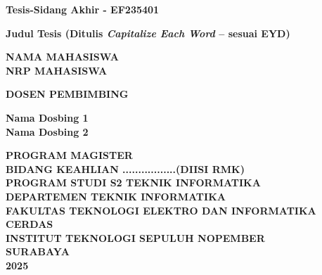 \documentclass[a4paper]{article}
\begin{document}
\begin{flushleft}
\hspace*{2.2cm}
\parbox{15cm}{
    {\fontsize{12pt}{14pt}\selectfont\bfseries Tesis-Sidang Akhir - EF235401}
    
    \vspace{0.5cm}
    
    {\fontsize{18pt}{22pt}\selectfont\bfseries 
    Judul Tesis (Ditulis \textit{Capitalize Each Word} – sesuai EYD)}
    
    \vspace{2.5cm}
    
    {\fontsize{12pt}{14pt}\selectfont\bfseries 
    NAMA MAHASISWA\\
    NRP MAHASISWA}
    
    \vspace{1.3cm}
    
    {\fontsize{12pt}{14pt}\selectfont\bfseries DOSEN PEMBIMBING}
    
    \vspace{0.2cm}
    
    {\fontsize{12pt}{14pt}\selectfont\bfseries 
    Nama Dosbing 1\\
    Nama Dosbing 2}
    
    \vspace{1.3cm}
    
    {\fontsize{12pt}{14pt}\selectfont\bfseries 
    PROGRAM MAGISTER\\
    BIDANG KEAHLIAN .................(DIISI RMK)\\
    PROGRAM STUDI S2 TEKNIK INFORMATIKA\\
    DEPARTEMEN TEKNIK INFORMATIKA\\
    FAKULTAS TEKNOLOGI ELEKTRO DAN INFORMATIKA CERDAS\\
    INSTITUT TEKNOLOGI SEPULUH NOPEMBER\\
    SURABAYA\\
    2025}
}
\end{flushleft}
\end{document}
